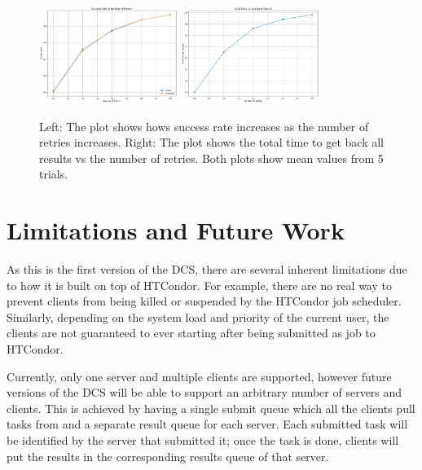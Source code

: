 \documentclass{article}
\begin{document}
\begin{figure}[t]
  \begin{center}
    \includegraphics[width=0.4\textwidth]{succ_rate_task_error_local.png}
    \includegraphics[width=0.4\textwidth]{timing_task_error_local.png}
    \caption{Left: The plot shows hows success rate increases as the number of retries increases. Right: The plot shows the total time to get back all results vs the number of retries. Both plots show mean values from 5 trials.}
    \label{fg:success_rate}
  \end{center}
\end{figure}
\section{Limitations and Future Work}

As this is the first version of the DCS, there are several inherent limitations due to how it is built on top of HTCondor. For example, there are no real way to prevent clients from being killed or suspended by the HTCondor job scheduler. Similarly, depending on the system load and priority of the current user, the clients are not guaranteed to ever starting after being submitted as job to HTCondor.

Currently, only one server and multiple clients are supported, however future versions of the DCS will be able to support an arbitrary number of servers and clients. This is achieved by having a single submit queue which all the clients pull tasks from and a separate result queue for each server. Each submitted task will be identified by the server that submitted it; once the task is done, clients will put the results in the corresponding results queue of that server.
\end{document}
